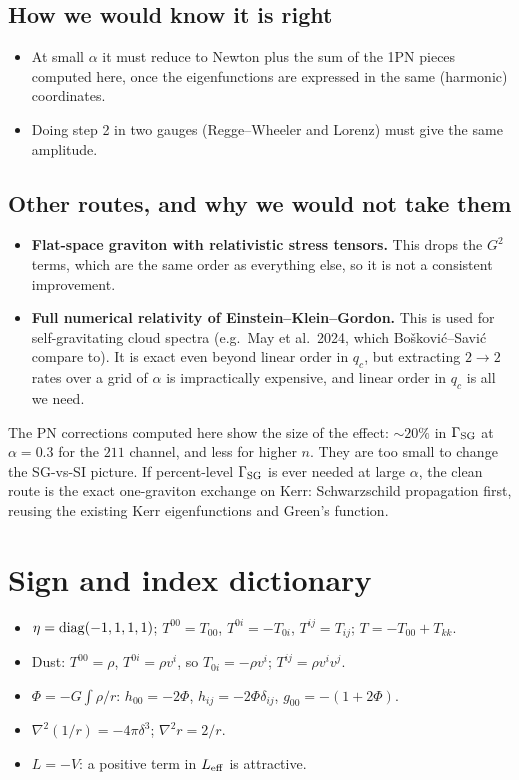 \documentclass[11pt]{article}
\begin{document}
\subsection{How we would know it is right}
\begin{itemize}[leftmargin=1.4em]
\item At small $\alpha$ it must reduce to Newton plus the sum of the 1PN pieces computed here, once the eigenfunctions are expressed in the same (harmonic) coordinates.
\item Doing step 2 in two gauges (Regge--Wheeler and Lorenz) must give the same amplitude.
\end{itemize}

\subsection{Other routes, and why we would not take them}
\begin{itemize}[leftmargin=1.4em]
\item \textbf{Flat-space graviton with relativistic stress tensors.} This drops the $G^2$ terms, which are the same order as everything else, so it is not a consistent improvement.
\item \textbf{Full numerical relativity of Einstein--Klein--Gordon.} This is used for self-gravitating cloud spectra (e.g.\ May et al.\ 2024, which Bo\v{s}kovi\'c--Savi\'c compare to). It is exact even beyond linear order in $q_c$, but extracting $2\to2$ rates over a grid of $\alpha$ is impractically expensive, and linear order in $q_c$ is all we need.
\end{itemize}

\begin{result}
The PN corrections computed here show the size of the effect: $\sim20\%$ in $\Gamma_{\rm SG}$ at $\alpha=0.3$ for the $211$ channel, and less for higher $n$. They are too small to change the SG-vs-SI picture. If percent-level $\Gamma_{\rm SG}$ is ever needed at large $\alpha$, the clean route is the exact one-graviton exchange on Kerr: Schwarzschild propagation first, reusing the existing Kerr eigenfunctions and Green's function.
\end{result}

\appendix
\section{Sign and index dictionary}
\begin{itemize}[nosep,leftmargin=1.4em]
\item $\eta={\rm diag}(-1,1,1,1)$; $T^{00}=T_{00}$, $T^{0i}=-T_{0i}$, $T^{ij}=T_{ij}$; $T=-T_{00}+T_{kk}$.
\item Dust: $T^{00}=\rho$, $T^{0i}=\rho v^i$, so $T_{0i}=-\rho v^i$; $T^{ij}=\rho v^iv^j$.
\item $\Phi=-G\int\rho/r$: $h_{00}=-2\Phi$, $h_{ij}=-2\Phi\delta_{ij}$, $g_{00}=-(1+2\Phi)$.
\item $\nabla^2(1/r)=-4\pi\delta^3$; $\nabla^2r=2/r$.
\item $L=-V$: a positive term in $L_{\rm eff}$ is attractive.
\end{itemize}
\end{document}
